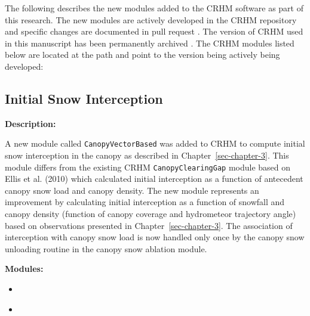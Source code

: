 \documentclass[
  letterpaper,
]{tex/uofsthesis-cs}
\providecommand{\tightlist}{%
  \setlength{\itemsep}{0pt}\setlength{\parskip}{0pt}}
\begin{document}
The following describes the new modules added to the CRHM software as
part of this research. The new modules are actively developed in the
CRHM repository
\href{https://github.com/acebulsk/crhmcode/blob/alex-ceb-thesis-changes}{\color{blue}{here}}
and specific changes are documented in pull request
\href{https://github.com/srlabUsask/crhmcode/pull/471}{\color{blue}{\#471}}.
The version of CRHM used in this manuscript has been permanently
archived
\href{https://doi.org/10.5281/zenodo.17981431}{\color{blue}{here}}. The
CRHM modules listed below are located at the path and point to the
version being actively being developed:

\href{https://github.com/acebulsk/crhmcode/blob/alex-ceb-thesis-changes/crhmcode/src/modules}{\color{blue}{https://github.com/acebulsk/crhmcode/blob/alex-ceb-thesis-changes/crhmcode/src/modules}}

\subsection{Initial Snow Interception}\label{initial-snow-interception}

\textbf{Description:}

A new module called \texttt{CanopyVectorBased} was added to CRHM to
compute initial snow interception in the canopy as described in
Chapter~\ref{sec-chapter-3}. This module differs from the existing CRHM
\texttt{CanopyClearingGap} module based on Ellis et al. (2010) which
calculated initial interception as a function of antecedent canopy snow
load and canopy density. The new module represents an improvement by
calculating initial interception as a function of snowfall and canopy
density (function of canopy coverage and hydrometeor trajectory angle)
based on observations presented in Chapter~\ref{sec-chapter-3}. The
association of interception with canopy snow load is now handled only
once by the canopy snow unloading routine in the canopy snow ablation
module.

\textbf{Modules:}

\begin{itemize}
\tightlist
\item
  \href{https://github.com/acebulsk/crhmcode/blob/alex-ceb-thesis-changes/crhmcode/src/modules/ClassCRHMCanopyVectorBased.cpp}{\color{blue}{ClassCRHMCanopyVectorBased.cpp}}
\item
  \href{https://github.com/acebulsk/crhmcode/blob/alex-ceb-thesis-changes/crhmcode/src/modules/ClassCRHMCanopyVectorBased.h}{\color{blue}{ClassCRHMCanopyVectorBased.h}}
\end{itemize}
\end{document}
